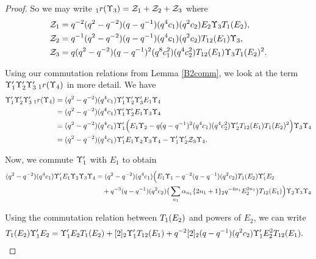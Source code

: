 \documentclass[a4 paper, 10pt]{article}
\begin{document}
\begin{proof}
So we may write ${}_{1}r(\Upsilon_{3}) = \mathcal{Z}_1 + \mathcal{Z}_2 + \mathcal{Z}_3$ where
	\begin{align*}
		\mathcal{Z}_1 &= q^{ -2 } ( q^{ 2 } - q^{ -2 } ) ( q - q^{ -1 } ) ( q^{ 4 } c_1 ) ( q^{ 2 } c_2 ) E_2 \Upsilon_{3} T_{1}(E_2), \\
		\mathcal{Z}_2 &= q^{ -1 } ( q^{ 2 } - q^{ -2 } )( q - q^{ -1 } ) ( q^{ 4 } c_1 ) ( q^{ 2 } c_2 ) T_{12}(E_1) \Upsilon_{3}, \\
		\mathcal{Z}_3 &= q ( q^{ 2 } - q^{ -2 } )( q - q^{ -1 } )^{ 2 } ( q^{ 8 } c_1^ { 2 } ) ( q^{ 4 } c_2^{ 2 } ) T_{12}(E_1) \Upsilon_{3} T_{1}(E_2)^{ 2 }.
	\end{align*}
	
Using our commutation relations from Lemma \ref{B2comm}, we look at the term $ \Upsilon^{\prime}_{1} \Upsilon^{\prime}_{2} \Upsilon^{\prime}_{3} \: {}_{1}r(\Upsilon_4)$ in more detail. We have
	\begin{align*}
		\Upsilon^{\prime}_{1} \Upsilon^{\prime}_{2} \Upsilon^{\prime}_{3} \: {}_{1}r(\Upsilon_4) 	&= ( q^{ 2 } - q^{ -2 } )( q^{ 4 } c_1 ) \Upsilon^{\prime}_{1} \Upsilon^{\prime}_{2} \Upsilon^{\prime}_{3} E_1 \Upsilon_{4} \\
												&= ( q^{ 2 } - q^{ -2 } )( q^{ 4 } c_1 ) \Upsilon^{\prime}_{1} \Upsilon^{\prime}_{2} E_1 \Upsilon_{3} \Upsilon_{4} \\
												&= ( q^{ 2 } - q^{ -2 } )( q^{ 4 } c_1 ) \Upsilon^{\prime}_{1} \Big( E_1 \Upsilon_2 - q( q - q^{ -1 } )^{ 2 } ( q^{ 4 } c_1 ) ( q^{ 4 } c_2^{ 2 } ) \Upsilon^{\prime}_{2} T_{12}(E_1)T_{1}(E_2)^{ 2 } \Big) \Upsilon_{3} \Upsilon_{4} \\
												&= ( q^{ 2 } - q^{ -2 } )( q^{ 4 } c_1 ) \Upsilon^{\prime}_{1} E_1 \Upsilon_{2} \Upsilon_{3} \Upsilon_{4} - \Upsilon^{\prime}_{1} \Upsilon^{\prime}_{2} \mathcal{Z}_3 \Upsilon_{4}.
	\end{align*} 

Now, we commute $\Upsilon^{\prime}_{1}$ with $E_1$ to obtain
	\begin{align}
		( q^{ 2 } - q^{ -2 } )( q^{ 4 } c_1 ) \Upsilon^{\prime}_{1} E_1 \Upsilon_{2} \Upsilon_{3} \Upsilon_{4} 
			&= ( q^{ 2 } - q^{ -2 } )( q^{ 4 } c_1 ) \Big( E_1 \Upsilon_{1} - q^{ -2 } ( q - q^{ -1 } ) ( q^{ 2 } c_2 ) T_{1}(E_2) \Upsilon^{\prime}_{1} E_2 \nonumber \\
		 	&\quad{} +  q^{-3} ( q - q^{ -1 } )( q^{ 2} c_2 ) \big( \sum_{n_1} \alpha_{n_1} \{ 2n_1 + 1 \}_2 q^{-4n_1} E_2^{2n_1} \big) T_{12}(E_1) \Big) \Upsilon_{2} \Upsilon_{3} \Upsilon_{4} \label{eq:Y1E1comm} 
	\end{align}
	
Using the commutation relation between $T_{1}(E_2)$ and powers of $E_2$, we can write
	\begin{align*}
		T_{1}(E_2) \Upsilon^{\prime}_{1} E_2 &= \Upsilon^{\prime}_{1} E_2 T_{1}(E_2) + [ 2 ]_{2} \Upsilon^{\prime}_{1} T_{12}(E_1) + q^{ -2 } [ 2 ]_{2} ( q - q^{ -1 } ) ( q^{ 2 } c_2 ) \Upsilon^{\prime}_{1} E_2^{ 2 } T_{12}(E_1).
	\end{align*}


\end{proof}
\end{document}
